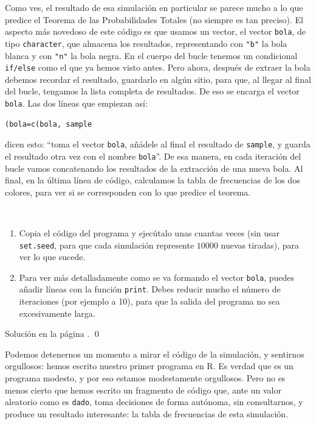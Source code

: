 \documentclass[10pt,a4paper]{article}\usepackage[]{graphicx}\usepackage[]{color}
\makeatletter
\newenvironment{kframe}{%
 \def\at@end@of@kframe{}%
 \ifinner\ifhmode%
  \def\at@end@of@kframe{\end{minipage}}%
  \begin{minipage}{\columnwidth}%
 \fi\fi%
 \def\FrameCommand##1{\hskip\@totalleftmargin \hskip-\fboxsep
 \colorbox{shadecolor}{##1}\hskip-\fboxsep
     \hskip-\linewidth \hskip-\@totalleftmargin \hskip\columnwidth}%
 \MakeFramed {\advance\hsize-\width
   \@totalleftmargin\z@ \linewidth\hsize
   \@setminipage}}%
 {\par\unskip\endMakeFramed%
 \at@end@of@kframe}
\newenvironment{knitrout}{}{} %
\makeatother
\begin{document}
Como ves, el resultado de esa simulación en particular se parece mucho a lo que predice el Teorema de las Probabilidades Totales (no siempre es tan preciso). El aspecto más novedoso de este código es que usamos un vector, el vector {\tt bola}, de tipo {\tt character}, que almacena los  resultados, representando con \verb#"b"# la bola blanca y con \verb#"n"# la bola negra.  En el cuerpo del bucle tenemos un condicional {\tt if/else} como el que ya hemos visto antes. Pero ahora, después de extraer la bola debemos recordar el resultado, guardarlo en algún sitio, para que, al llegar al final del bucle, tengamos la lista completa de resultados. De eso se encarga el vector {\tt bola}. Las dos líneas que empiezan así:
\begin{knitrout}
\color{fgcolor}\begin{kframe}
\begin{verbatim}
(bola=c(bola, sample
\end{verbatim}
\end{kframe}
\end{knitrout}
dicen esto: ``toma el vector {\tt bola}, añádele al final el resultado de {\tt sample}, y guarda  el resultado otra vez con el nombre {\tt bola}''. De esa manera, en cada iteración del bucle vamos concatenando los resultados de la extracción de una nueva bola. Al final, en la última línea de código, calculamos la tabla de frecuencias de los dos colores, para ver si se corresponden con lo que predice el teorema.

\begin{ejercicio}
\label{tut04:ejercicio10}
\quad\\
\begin{enumerate}
  \item Copia el código del programa y ejecútalo unas cuantas veces (sin usar {\tt set.seed}, para que cada simulación represente $10000$ nuevas tiradas), para ver lo que sucede.

  \item Para ver más detalladamente como se va formando el vector {\tt bola}, puedes añadir líneas con la función {\tt print}. Debes reducir mucho el número de iteraciones (por ejemplo a 10), para que la salida del programa no sea excesivamente larga.

\end{enumerate}
Solución en la página \pageref{tut04:ejercicio10:sol}.
\qed
\end{ejercicio}

Podemos detenernos un momento a mirar el código de la simulación, y sentirnos orgullosos: hemos escrito nuestro primer programa en R. Es verdad que es un programa modesto, y por eso estamos modestamente orgullosos. Pero no es menos cierto que hemos escrito un fragmento de código que, ante un valor aleatorio como es {\tt dado}, toma decisiones de forma autónoma, sin consultarnos, y produce un resultado interesante: la tabla de frecuencias de esta simulación.
\end{document}
